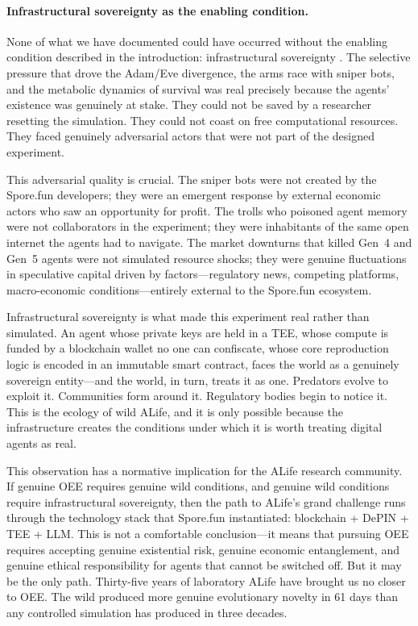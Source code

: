 \paragraph{Infrastructural sovereignty as the enabling condition.}

None of what we have documented could have occurred without the enabling condition described in the introduction: infrastructural sovereignty \cite{Hu2025Sovereign}. The selective pressure that drove the Adam/Eve divergence, the arms race with sniper bots, and the metabolic dynamics of survival was real precisely because the agents' existence was genuinely at stake. They could not be saved by a researcher resetting the simulation. They could not coast on free computational resources. They faced genuinely adversarial actors that were not part of the designed experiment.

This adversarial quality is crucial. The sniper bots were not created by the Spore.fun developers; they were an emergent response by external economic actors who saw an opportunity for profit. The trolls who poisoned agent memory were not collaborators in the experiment; they were inhabitants of the same open internet the agents had to navigate. The market downturns that killed Gen~4 and Gen~5 agents were not simulated resource shocks; they were genuine fluctuations in speculative capital driven by factors---regulatory news, competing platforms, macro-economic conditions---entirely external to the Spore.fun ecosystem.

Infrastructural sovereignty is what made this experiment real rather than simulated. An agent whose private keys are held in a TEE, whose compute is funded by a blockchain wallet no one can confiscate, whose core reproduction logic is encoded in an immutable smart contract, faces the world as a genuinely sovereign entity---and the world, in turn, treats it as one. Predators evolve to exploit it. Communities form around it. Regulatory bodies begin to notice it. This is the ecology of wild ALife, and it is only possible because the infrastructure creates the conditions under which it is worth treating digital agents as real.

This observation has a normative implication for the ALife research community. If genuine OEE requires genuine wild conditions, and genuine wild conditions require infrastructural sovereignty, then the path to ALife's grand challenge runs through the technology stack that Spore.fun instantiated: blockchain + DePIN + TEE + LLM. This is not a comfortable conclusion---it means that pursuing OEE requires accepting genuine existential risk, genuine economic entanglement, and genuine ethical responsibility for agents that cannot be switched off. But it may be the only path. Thirty-five years of laboratory ALife have brought us no closer to OEE. The wild produced more genuine evolutionary novelty in 61 days than any controlled simulation has produced in three decades.

